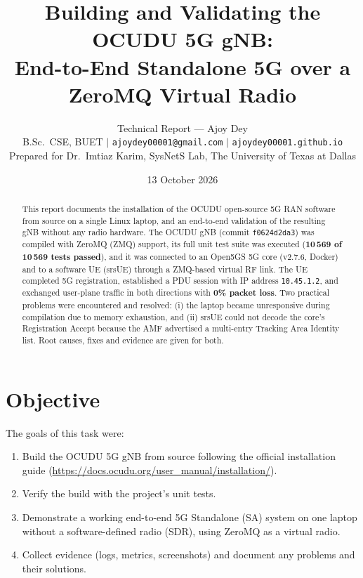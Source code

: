 \documentclass[11pt,a4paper]{article}
\title{\textbf{Building and Validating the OCUDU 5G gNB:}\\
\textbf{End-to-End Standalone 5G over a ZeroMQ Virtual Radio}}
\author{%
  Technical Report --- Ajoy Dey\\
  \small B.Sc.\ CSE, BUET \;$|$\; \texttt{ajoydey00001@gmail.com} \;$|$\; \texttt{ajoydey00001.github.io}\\
  \small Prepared for Dr.\ Imtiaz Karim, SysNetS Lab, The University of Texas at Dallas}
\date{\small 13 October 2026}
\begin{document}
\maketitle

\begin{abstract}
This report documents the installation of the OCUDU open-source 5G RAN software
from source on a single Linux laptop, and an end-to-end validation of the
resulting gNB without any radio hardware. The OCUDU gNB (commit
\texttt{f0624d2da3}) was compiled with ZeroMQ (ZMQ) support, its full unit test
suite was executed (\textbf{10\,569 of 10\,569 tests passed}), and it was
connected to an Open5GS 5G core (v2.7.6, Docker) and to a software UE (srsUE)
through a ZMQ-based virtual RF link. The UE completed 5G registration,
established a PDU session with IP address \texttt{10.45.1.2}, and exchanged
user-plane traffic in both directions with \textbf{0\% packet loss}. Two
practical problems were encountered and resolved: (i) the laptop became
unresponsive during compilation due to memory exhaustion, and (ii) srsUE could
not decode the core's Registration Accept because the AMF advertised a
multi-entry Tracking Area Identity list. Root causes, fixes and evidence are
given for both.
\end{abstract}

\tableofcontents
\newpage

\section{Objective}

The goals of this task were:
\begin{enumerate}[itemsep=2pt]
  \item Build the OCUDU 5G gNB from source following the official installation
        guide (\url{https://docs.ocudu.org/user_manual/installation/}).
  \item Verify the build with the project's unit tests.
  \item Demonstrate a working end-to-end 5G Standalone (SA) system on one laptop
        without a software-defined radio (SDR), using ZeroMQ as a virtual radio.
  \item Collect evidence (logs, metrics, screenshots) and document any problems
        and their solutions.
\end{enumerate}
\end{document}

